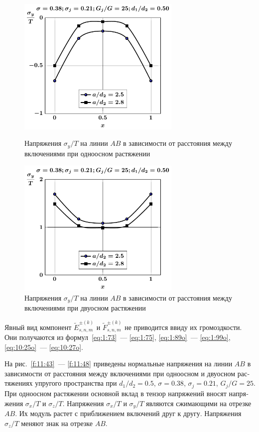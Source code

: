 \begin{russian}
\begin{figure}[h!]
\centering\footnotesize
\parbox[b]{7.5cm}{\centering\includegraphics[width=7.8cm]{periodic-oblate-inc27-a-d50-g25-t1-sig_y.pdf}
\caption{Напряжения $\sigma_y/T$ на линии $AB$ в зависимости от расстояния между включениями при одноосном растяжении
\label{f:11:45}}}\hfil\hfil
\parbox[b]{7.5cm}{\centering\includegraphics[width=7.8cm]{periodic-oblate-inc27-a-d50-g25-t2-sig_y.pdf}
\caption{Напряжения $\sigma_y/T$ на линии $AB$ в зависимости от расстояния между включениями при двуосном растяжении
\label{f:11:46}}}
\end{figure}

Явный вид компонент $\tilde E_{s,n,m}^{\pm(k)}$ и $\tilde F_{s,n,m}^{\pm(k)}$ не приводится ввиду их громоздкости. Они получаются из формул~\eqref{eq:1:73}~--- \eqref{eq:1:75}, \eqref{eq:1:89o}~--- \eqref{eq:1:99o}, \eqref{eq:10:25o}~--- \eqref{eq:10:27o}.

На рис.~\ref{f:11:43}~--- \ref{f:11:48} приведены нормальные напряжения на линии $AB$ в зависимости от расстояния между включениями при одноосном и двуосном растяжениях упругого пространства при $d_1/d_2=0.5$, $\sigma=0.38$, $\sigma_j=0.21$, $G_j/G=25$.
При одноосном растяжении основной вклад в тензор напряжений вносят напряжения $\sigma_x/T$ и $\sigma_z/T$. Напряжения $\sigma_x/T$ и $\sigma_y/T$ являются сжимающими на отрезке $AB$. Их модуль растет с приближением включений друг к другу. Напряжения $\sigma_z/T$ меняют знак на отрезке $AB$.


\end{russian}
